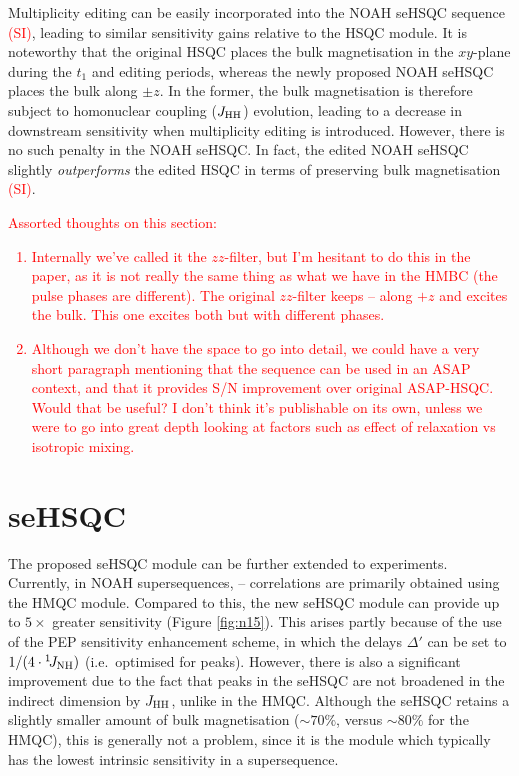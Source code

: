 \documentclass[11pt]{article}
\newcommand*{\carbon}{\ce{^{13}C}}
\newcommand*{\proton}{\ce{^{1}H}}
\newcommand*{\nitrogen}{\ce{^{15}N}}
\newcommand*{\red}[1]{\textcolor{red}{#1}}
\newcommand*{\onejnh}{{}^{1}\!J_{\ce{NH}}}
\newcommand*{\jhh}{J_{\ce{HH}}}
\newcommand*{\figref}[1]{Figure \ref{fig:#1}}
\newcommand*{\sitodo}{\red{(SI)}}
\begin{document}
Multiplicity editing can be easily incorporated into the NOAH seHSQC sequence \sitodo{}, leading to similar sensitivity gains relative to the HSQC module.
It is noteworthy that the original HSQC places the bulk magnetisation in the $xy$-plane during the $t_1$ and editing periods, whereas the newly proposed NOAH seHSQC places the bulk along $\pm z$.
In the former, the bulk magnetisation is therefore subject to homonuclear coupling ($\jhh$) evolution, leading to a decrease in downstream sensitivity when multiplicity editing is introduced.
However, there is no such penalty in the NOAH seHSQC.
In fact, the edited NOAH seHSQC slightly \textit{outperforms} the edited HSQC in terms of preserving bulk magnetisation \sitodo{}.

\red{
    Assorted thoughts on this section:
    \begin{enumerate}
        \item Internally we've called it the $zz$-filter, but I'm hesitant to do this in the paper, as it is not really the same thing as what we have in the HMBC (the pulse phases are different). The original $zz$-filter keeps \carbon{}--\proton{} along $+z$ and excites the bulk. This one excites both but with different phases.
        \item Although we don't have the space to go into detail, we could have a very short paragraph mentioning that the sequence can be used in an ASAP context, and that it provides S/N improvement over original ASAP-HSQC. Would that be useful? I don't think it's publishable on its own, unless we were to go into great depth looking at factors such as effect of relaxation vs isotropic mixing.
    \end{enumerate}
}

\section*{\texorpdfstring{\nitrogen{}}{15N} seHSQC}

The proposed seHSQC module can be further extended to \nitrogen{} experiments.
Currently, in NOAH supersequences, \nitrogen{}--\proton{} correlations are primarily obtained using the HMQC module.\autocite{Kupce2007MRC, Kupce2017ACIE}
Compared to this, the new seHSQC module can provide up to $5\times$ greater sensitivity (\figref{n15}).
This arises partly because of the use of the PEP sensitivity enhancement scheme, in which the delays $\Delta'$ can be set to $1/(4 \cdot \onejnh)$ (i.e.\ optimised for  peaks).
However, there is also a significant improvement due to the fact that peaks in the seHSQC are not broadened in the indirect dimension by $\jhh$, unlike in the HMQC.
Although the seHSQC retains a slightly smaller amount of bulk magnetisation ($\sim 70\%$, versus $\sim 80\%$ for the HMQC), this is generally not a problem, since it is the \nitrogen{} module which typically has the lowest intrinsic sensitivity in a supersequence.
\end{document}
